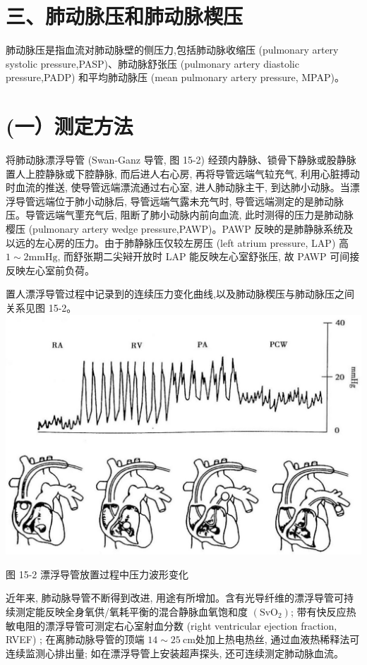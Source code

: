 \documentclass[10pt]{article}
\begin{document}
\section*{三、肺动脉压和肺动脉楔压}
肺动脉压是指血流对肺动脉壁的侧压力,包括肺动脉收缩压 (pulmonary artery systolic pressure,PASP)、肺动脉舒张压 (pulmonary artery diastolic pressure,PADP) 和平均肺动脉压 (mean pulmonary artery pressure, MPAP)。

\section*{(一）测定方法}
将肺动脉漂浮导管 (Swan-Ganz 导管, 图 15-2) 经颈内静脉、锁骨下静脉或股静脉置人上腔静脉或下腔静脉, 而后进人右心房, 再将导管远端气䢂充气, 利用心脏搏动时血流的推送, 使导管远端漂流通过右心室, 进人肺动脉主干, 到达肺小动脉。当漂浮导管远端位于肺小动脉后, 导管远端气露未充气时, 导管远端测定的是肺动脉压。导管远端气䙵充气后, 阻断了肺小动脉内前向血流, 此时测得的压力是肺动脉樱压 (pulmonary artery wedge pressure,PAWP)。PAWP 反映的是肺静脉系统及以远的左心房的压力。由于肺静脉压仅较左房压 (left atrium pressure, LAP) 高 $1 \sim 2 \mathrm{mmHg}$, 而舒张期二尖㦚开放时 LAP 能反映左心室舒张压, 故 PAWP 可间接反映左心室前负荷。

置人漂浮导管过程中记录到的连续压力变化曲线,以及肺动脉楔压与肺动脉压之间关系见图 15-2。\\
\includegraphics[max width=\textwidth, center]{2024_07_09_002a177993bd97d1d6d7g-159}

图 15-2 漂浮导管放置过程中压力波形变化

近年来, 肺动脉导管不断得到改进, 用途有所增加。含有光导纤维的漂浮导管可持续测定能反映全身氧供/氧耗平衡的混合静脉血氧饱和度 $\left(\mathrm{SvO}_{2}\right)$; 带有快反应热敏电阻的漂浮导管可测定右心室射血分数 (right ventricular ejection fraction, RVEF) ; 在离肺动脉导管的顶端 $14 \sim 25 \mathrm{~cm}$处加上热电热丝, 通过血液热稀释法可连续监测心排出量; 如在漂浮导管上安装超声探头, 还可连续测定肺动脉血流。
\end{document}
